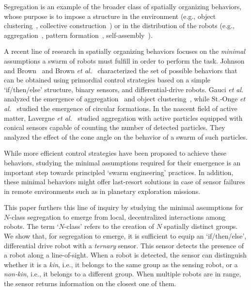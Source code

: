 \documentclass[letterpaper, 10 pt, conference]{ieeeconf}
\begin{document}
Segregation is an example of the broader class of spatially organizing
behaviors, whose purpose is to impose a structure in the environment (e.g.,
object clustering~\cite{gauci_clustering_2014}, collective
construction~\cite{Bolger2010}) or in the distribution of the robots (e.g.,
aggregation~\cite{shlyakhov_survey_2017}, pattern
formation~\cite{Pinciroli:DARS2016}, self-assembly~\cite{gross2008self}).

A recent line of research in spatially organizing behaviors focuses on the
\emph{minimal} assumptions a swarm of robots must fulfill in order to perform
the task. Johnson and Brown~\cite{johnson_evolving_2016} and Brown \emph{et
  al.}~\cite{brown_discovery_2018} characterized the set of possible behaviors
that can be obtained using primordial control strategies based on a simple
`if/then/else' structure, binary sensors, and differential-drive robots. Gauci
\emph{et al.} analyzed the emergence of aggregation~\cite{gauci_evolving_2014}
and object clustering~\cite{gauci_clustering_2014}, while St.-Onge \emph{et
  al.}~\cite{StOnge:IROS2018} studied the emergence of circular formations. In
the nascent field of active matter, Lavergne \emph{et al.}~\cite{Lavergne2019}
studied aggregation with active particles equipped with conical sensors capable
of counting the number of detected particles. They analyzed the effect of the
cone angle on the behavior of a swarm of such particles.

While more efficient control strategies have been proposed to achieve these
behaviors, studying the minimal assumptions required for their emergence is an
important step towards principled `swarm engineering' practices. In addition,
these minimal behaviors might offer last-resort solutions in case of sensor
failures in remote environments such as in planetary exploration missions.

This paper furthers this line of inquiry by studying the minimal assumptions for
$N$-class segregation to emerge from local, decentralized interactions among
robots. The term `$N$-class' refers to the creation of $N$ spatially distinct
groups. We show that, for segregation to emerge, it is sufficient to equip an
`if/then/else', differential drive robot with a \emph{ternary} sensor. This
sensor detects the presence of a robot along a line-of-sight. When a robot is detected, the
sensor can distinguish whether it is a \emph{kin}, i.e., it belongs to the same
group as the sensing robot, or a \emph{non-kin}, i.e., it belongs to a different
group. When multiple robots are in range, the sensor returns information on the
closest one of them.
\end{document}
